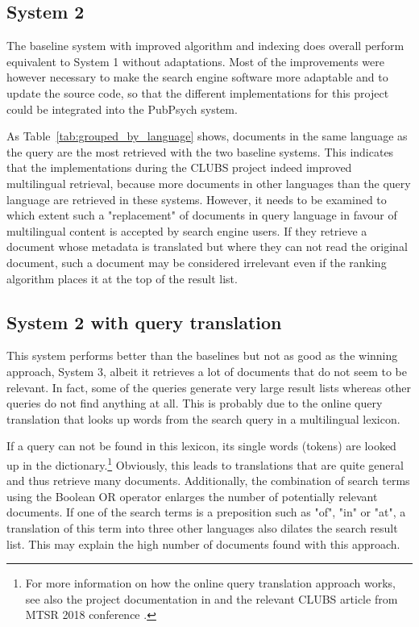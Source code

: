 \documentclass[a4paper,11pt]{article}
\begin{document}
\subsection{System 2}
The baseline system with improved algorithm and indexing does overall perform equivalent to System 1 without adaptations. Most of the improvements were however necessary to make the search engine software more adaptable and to update the source code, so that the different implementations for this project could be integrated into the PubPsych system.

As Table~\ref{tab:grouped_by_language} shows, documents in the same language as the query are the most retrieved with the two baseline systems. This indicates that the implementations during the CLUBS project indeed improved multilingual retrieval, because more documents in other languages than the query language are retrieved in these systems. However, it needs to be examined to which extent such a "replacement" of documents in query language in favour of multilingual content is accepted by search engine users. If they retrieve a document whose metadata is translated but where they can not read the original document, such a document may be considered irrelevant even if the ranking algorithm places it at the top of the result list.

\subsection{System 2 with query translation}
This system performs better than the baselines but not as good as the winning approach, System 3, albeit it retrieves a lot of documents that do not seem to be relevant. In fact, some of the queries generate very large result lists whereas other queries do not find anything at all. This is probably due to the online query translation that looks up words from the search query in a multilingual lexicon. 

If a query can not be found in this lexicon, its single words (tokens) are looked up in the dictionary.\footnote{For more information on how the online query translation approach works, see also the project documentation in \cite{m1.5_2018} and the relevant CLUBS article from MTSR 2018 conference \cite{espana_mtsr}.} Obviously, this leads to translations that are quite general and thus retrieve many documents. Additionally, the combination of search terms using the Boolean OR operator enlarges the number of potentially relevant documents. If one of the search terms is a preposition such as "of", "in" or "at", a translation of this term into three other languages also dilates the search result list. This may explain the high number of documents found with this approach.
\end{document}
